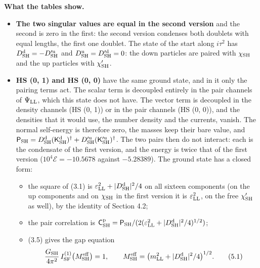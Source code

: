 \documentclass[
  10pt,
]{article}
\providecommand{\tightlist}{%
  \setlength{\itemsep}{0pt}\setlength{\parskip}{0pt}}
\begin{document}
\textbf{What the tables show.}

\begin{itemize}
\item
  \textbf{The two singular values are equal in the second version} and
  the second is zero in the first: the second version condenses both
  doublets with equal lengths, the first one doublet. The state of the
  start along \(i\tau^2\) has
  \(D^{\rm d}_{\rm SH}=-D'^{\rm u}_{\rm SH}\) and
  \(D^{\rm u}_{\rm SH}=D'^{\rm d}_{\rm SH}=0\): the down particles are
  paired with \(\chi_{\rm SH}\) and the up particles with
  \(\chi'_{\rm SH}\).
\item
  \textbf{HS (0, 1) and HS (0, 0)} have the same ground state, and in it
  only the pairing terms act. The scalar term is decoupled entirely in
  the pair channels of \(\Psi_{\rm LL}\), which this state does not
  have. The vector term is decoupled in the density channels (HS (0, 1))
  or in the pair channels (HS (0, 0)), and the densities that it would
  use, the number density and the currents, vanish. The normal
  self-energy is therefore zero, the masses keep their bare value, and
  \(\mathsf P_{\rm SH}=D^{\rm d}_{\rm SH}(\mathsf K^{\rm d}_{\rm SH})^\dagger+D'^{\rm u}_{\rm SH}(\mathsf K'^{\rm u}_{\rm SH})^\dagger\).
  The two pairs then do not interact: each is the condensate of the
  first version, and the energy is twice that of the first version
  (\(10^4\mathcal E=-10.5678\) against \(-5.28389\)). The ground state
  has a closed form:

  \begin{itemize}
  \tightlist
  \item
    the square of (3.1) is
    \(\varepsilon_{\rm LL}^2+\lvert D^{\rm d}_{\rm SH}\rvert^2/4\) on
    all sixteen components (on the up components and on
    \(\chi_{\rm SH}\) in the first version it is
    \(\varepsilon_{\rm LL}^2\), on the free \(\chi'_{\rm SH}\) as well),
    by the identity of Section 4.2;
  \item
    the pair correlation is
    \(\mathsf C^{\rm p}_{\rm SH}=\mathsf P_{\rm SH}/(2(\varepsilon_{\rm LL}^2+\lvert D^{\rm d}_{\rm SH}\rvert^2/4)^{1/2})\);
  \item
    (3.5) gives the gap equation
    \[\frac{G_{\rm SH}}{4\pi^2}\,I^{(1)}_{\rm SF}\big(M^{\rm eff}_{\rm SH}\big)=1,\qquad M^{\rm eff}_{\rm SH}=\big(m_{\rm LL}^2+\lvert D^{\rm d}_{\rm SH}\rvert^2/4\big)^{1/2}.\tag{5.1}\]
  \end{itemize}


\end{itemize}
\end{document}
